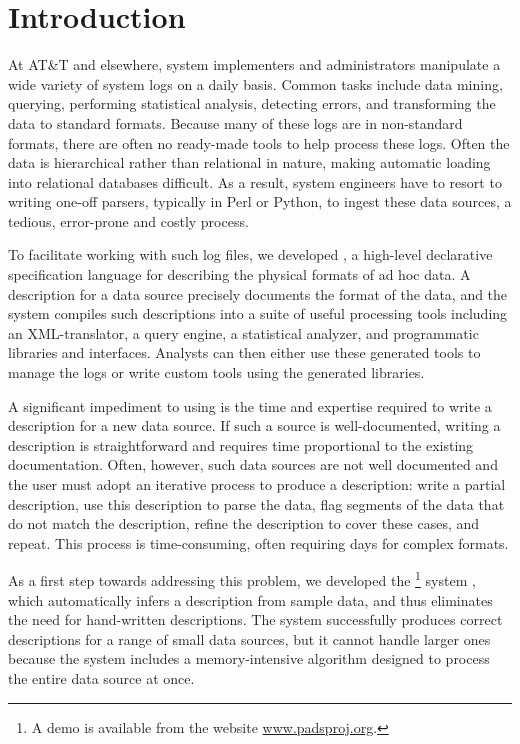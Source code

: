 \section{Introduction}
\label{sec:intro}

At AT\&T and elsewhere, system implementers and administrators
manipulate a wide variety of system logs on a daily basis.  Common
tasks include data mining, querying, performing statistical analysis,
detecting errors, and transforming the data to standard formats.
Because many of these logs are in non-standard formats, there are
often no ready-made tools to help process these logs.  Often the data
is hierarchical rather than relational in nature, making automatic
loading into relational databases difficult.  As a result, system
engineers have to resort to writing one-off parsers, typically in Perl
or Python, to ingest these data sources, a tedious, error-prone and
costly process.

To facilitate working with such log files, we developed \pads
\cite{fisher+:pads}, a high-level declarative
specification language for describing the physical formats of ad hoc
data. A \pads{} description for a data source precisely documents the
format of the data, and the \pads{} system compiles such descriptions
into a suite of useful processing tools including an XML-translator, a
query engine, a statistical analyzer, and programmatic libraries and
interfaces. Analysts can then either use these generated tools to
manage the logs or write custom tools using the generated libraries.

A significant impediment to using \pads{} is the time and 
expertise required to write a \pads{} description for a new data
source.  If such a source is well-documented, writing a \pads{}
description is straightforward and requires time proportional to the
existing documentation.  Often, however, such data sources are not
well documented and the user must adopt an iterative process to produce
a description: write a partial description, use this description to
parse the data, flag segments of the data that do not match the
description, refine the description to cover these cases, and repeat.
This process is time-consuming, often requiring days for complex
formats. 

As a first step towards addressing this problem, we developed the
\learnpads{}\footnote{
  A demo is available from the \pads{} website \url{www.padsproj.org}.
}
system \cite{Fisher+:dirttoshovels,xi08:tokenization-short},
which automatically infers a \pads{} description from sample data, and
thus eliminates the need for hand-written descriptions. The
\learnpads{} system successfully produces correct descriptions for a
range of small data sources, but it cannot handle larger ones because
the system includes a memory-intensive algorithm designed to process
the entire data source at once.

